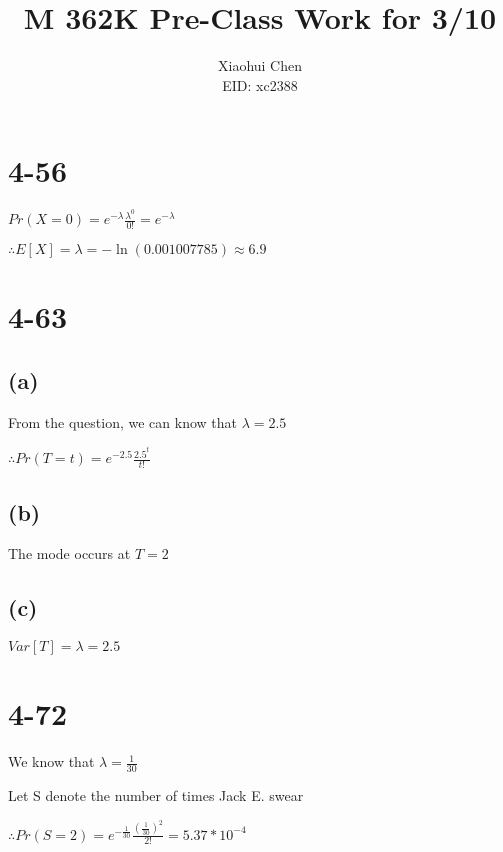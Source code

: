 \documentclass[12pt]{article}
\author{Xiaohui Chen \\EID: xc2388}
\title{M 362K Pre-Class Work for 3/10}
\begin{document}
\maketitle
\begin{spacing}{2.0}

\section*{4-56}

$Pr(X=0)= e^{-\lambda}\frac{\lambda^0}{0!}= e^{-\lambda}$

$\therefore E[X]= \lambda= -\ln(0.001007785) \approx 6.9$

\section*{4-63}

\subsection*{(a)}

From the question, we can know that $\lambda=2.5$

$\therefore Pr(T=t)= e^{-2.5}\frac{2.5^t}{t!}$

\subsection*{(b)}

The mode occurs at $T=2$

\subsection*{(c)}

$Var[T]= \lambda= 2.5$

\section*{4-72}

We know that $\lambda= \frac{1}{30}$

Let S denote the number of times Jack E. swear

$\therefore Pr(S=2)= e^{-\frac{1}{30}}\frac{\left( \frac{1}{30} \right)^2}{2!}= 5.37*10^{-4}$

\end{spacing}
\end{document}
